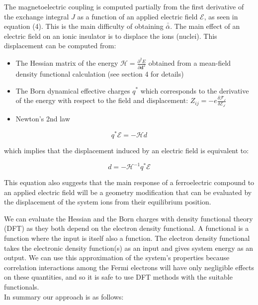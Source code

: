\documentclass[10pt]{article}
\begin{document}
The magnetoelectric coupling is computed partially from the first derivative of the exchange integral $J$ as a function of an applied electric field $\mathcal{E}$, as seen in equation (4). This is the main difficulty of obtaining $\bar{\bar{\alpha}}$. The main effect of an electric field on an ionic insulator is to displace the ions (nuclei). This displacement can be computed from:
\begin{itemize}
	\item The Hessian matrix of the
	energy $\mathcal{H} = \frac{\partial^2 E}{\partial \mathbf{d} ^2} $ obtained
	from a mean-field density functional calculation (see section 4 for details)
	\item The Born dynamical effective charges $q^*$ which corresponds to the derivative of the energy with respect to the field and displacement: $Z_{ij} = -e\frac{\delta \mathcal{F_i}}{\delta \mathcal{E_j}}$ \cite{lepetit2016compute}
	\item Newton's 2nd law
\end{itemize}

\begin{equation}
	q^* \mathcal{E} = -\mathcal{H} d
\end{equation}

which implies that the displacement induced by an electric field is equivalent to:

$$ d = -\mathcal{H}^{-1} q^* \mathcal{E} $$

This equation also suggests that the main response of a ferroelectric compound to an applied electric field will be a geometry modification that can be evaluated by the displacement of the system ions from their equilibrium position. 

We can evaluate the Hessian and the Born charges with density functional theory (DFT) as they both depend on the electron density functional. A functional is a function where the input is itself also a function. The electron density functional takes the electronic density function(s) as an input and gives system energy as an output. We can use this approximation of the system's properties because correlation interactions among the Fermi electrons will have only negligible effects on these quantities, and so it is safe to use DFT methods with the suitable functionals.
\\

In summary our approach is as follows:
\end{document}
